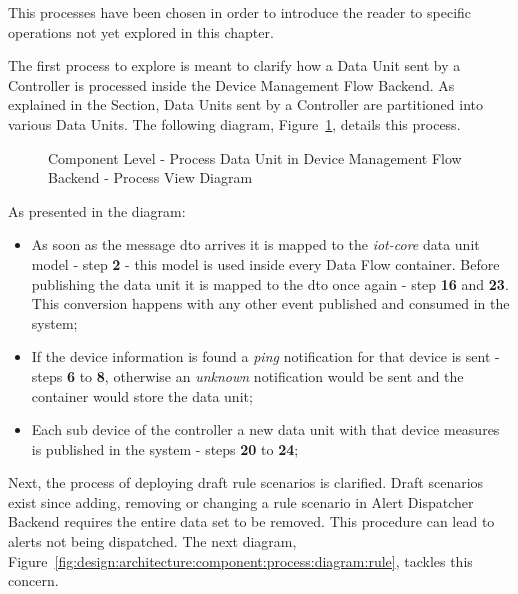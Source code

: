 This processes have been chosen in order to introduce the reader to specific operations not yet explored in this chapter.

The first process to explore is meant to clarify how a Data Unit sent by a Controller is processed inside the Device Management Flow Backend. As explained in the  Section, Data Units sent by a Controller are partitioned into various Data Units. The following diagram, Figure~\ref{fig:design:architecture:component:process:diagram:device}, details this process.

\begin{figure}[H]
   \centering
   \resizebox{\columnwidth}{!}
   {
      
   }
   \caption[Component Level - Process Data Unit in Device Management Flow Backend - Process View Diagram]{Component Level - Process Data Unit in Device Management Flow Backend - Process View Diagram}
   \label{fig:design:architecture:component:process:diagram:device}
\end{figure}

As presented in the diagram:

\begin{itemize}
   \item As soon as the message dto arrives it is mapped to the \textit{iot-core} data unit model - step \textbf{2} - this model is used inside every Data Flow container. Before publishing the data unit it is mapped to the dto once again - step \textbf{16} and \textbf{23}. This conversion happens with any other event published and consumed in the system;
   \item If the device information is found a \textit{ping} notification for that device is sent - steps \textbf{6} to \textbf{8}, otherwise an \textit{unknown} notification would be sent and the container would store the data unit;
   \item Each sub device of the controller a new data unit with that device measures is published in the system - steps \textbf{20} to \textbf{24};
\end{itemize}

Next, the process of deploying draft rule scenarios is clarified.
Draft scenarios exist since adding, removing or changing a rule scenario in Alert Dispatcher Backend requires the entire data set to be removed. This procedure can lead to alerts not being dispatched. The next diagram, Figure~\ref{fig:design:architecture:component:process:diagram:rule}, tackles this concern. 

